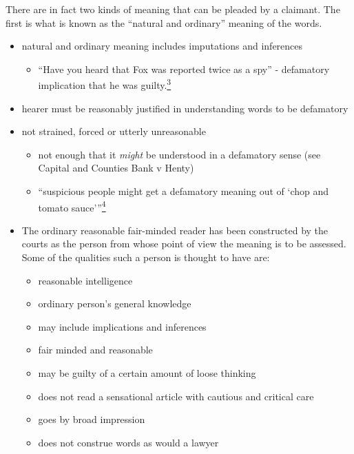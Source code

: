 \documentclass[]{article}
\begin{document}
There are in fact two kinds of meaning that can be pleaded by a
claimant. The first is what is known as the ``natural and ordinary''
meaning of the words.

\begin{itemize}
\item
  natural and ordinary meaning includes imputations and inferences

  \begin{itemize}
  \item
    ``{Have you heard that Fox was reported twice as a spy'' -
    defamatory implication that he was
    guilty.\hyperref[sdfootnote3sym]{\textsuperscript{3}}}
  \end{itemize}
\item
  hearer must be reasonably justified in understanding words to be
  defamatory
\item
  not strained, forced or utterly unreasonable

  \begin{itemize}
  \item
    {not enough that it }\emph{{might}}{{ be understood in a defamatory
    sense (see Capital and Counties Bank v Henty)}}
  \item
    ``{{suspicious people might get a defamatory meaning out of `chop
    and tomato sauce'''\hyperref[sdfootnote4sym]{\textsuperscript{4}}}}
  \end{itemize}
\item
  The ordinary reasonable fair-minded reader has been constructed by the
  courts as the person from whose point of view the meaning is to be
  assessed. Some of the qualities such a person is thought to have are:

  \begin{itemize}
  \item
    reasonable intelligence
  \item
    ordinary person's general knowledge
  \item
    may include implications and inferences
  \item
    fair minded and reasonable
  \item
    may be guilty of a certain amount of loose thinking
  \item
    does not read a sensational article with cautious and critical care
  \item
    goes by broad impression
  \item
    does not construe words as would a lawyer
  \end{itemize}
\end{itemize}
\end{document}
